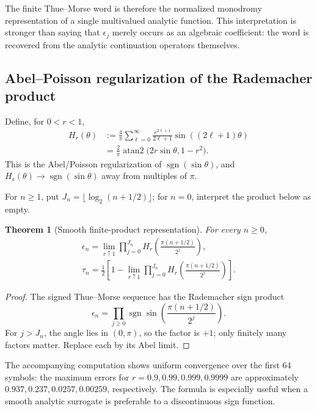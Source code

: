 \documentclass[11pt,oneside]{article}
\newtheorem{theorem}{Theorem}[section]
\theoremstyle{definition}
\newcommand{\sgn}{\operatorname{sgn}}
\begin{document}
The finite Thue--Morse word is therefore the normalized monodromy representation of a single
multivalued analytic function. This interpretation is stronger than saying that
\(\epsilon_j\) merely occurs as an algebraic coefficient: the word is recovered from the
analytic continuation operators themselves.

\subsection{Abel--Poisson regularization of the Rademacher product}

Define, for \(0<r<1\),
\begin{align}
 H_r(\theta)
 &:=\frac{4}{\pi}\sum_{\ell=0}^{\infty}
 \frac{r^{2\ell+1}}{2\ell+1}\sin((2\ell+1)\theta)
 \label{eq:Hr-series}\\
 &=\frac{2}{\pi}\operatorname{atan2}
 \bigl(2r\sin\theta,1-r^2\bigr).
 \label{eq:Hr-atan}
\end{align}
This is the Abel/Poisson regularization of \(\sgn(\sin\theta)\), and
\(H_r(\theta)\to\sgn(\sin\theta)\) away from multiples of \(\pi\).

For \(n\ge1\), put \(J_n=\lfloor\log_2(n+1/2)\rfloor\); for \(n=0\), interpret the product
below as empty.

\begin{theorem}[Smooth finite-product representation]
\label{thm:Abel-TM}
For every \(n\ge0\),
\begin{align}
 \boxed{\displaystyle
 \epsilon_n=\lim_{r\uparrow1}
 \prod_{j=0}^{J_n}H_r\!\left(\frac{\pi(n+1/2)}{2^j}\right),}
 \label{eq:epsilon-Abel}\\
 \boxed{\displaystyle
 \tau_n=\frac12\left[1-
 \lim_{r\uparrow1}\prod_{j=0}^{J_n}H_r\!\left(\frac{\pi(n+1/2)}{2^j}\right)\right].}
 \label{eq:tau-Abel}
\end{align}
\end{theorem}

\begin{proof}
The signed Thue--Morse sequence has the Rademacher sign product
\[
 \epsilon_n=\prod_{j\ge0}\sgn\sin\!\left(\frac{\pi(n+1/2)}{2^j}\right).
\]
For \(j>J_n\), the angle lies in \((0,\pi)\), so the factor is \(+1\); only finitely many
factors matter. Replace each by its Abel limit.
\end{proof}

The accompanying computation shows uniform convergence over the first 64 symbols: the
maximum errors for \(r=0.9,0.99,0.999,0.9999\) are approximately
\(0.937,0.237,0.0257,0.00259\), respectively. The formula is especially useful when a smooth
analytic surrogate is preferable to a discontinuous sign function.
\end{document}
